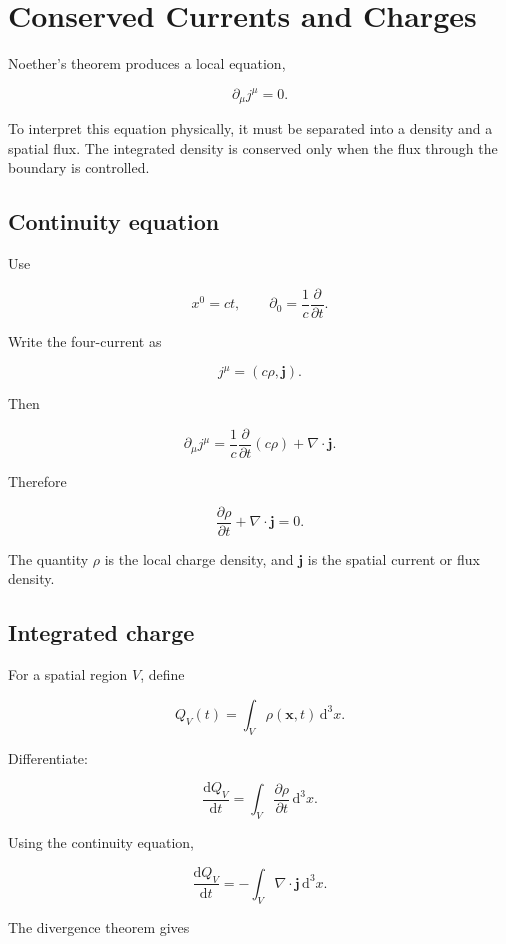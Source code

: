 \section{Conserved Currents and Charges}
\label{sec:conserved_currents_charges}

Noether's theorem produces a local equation,

\[
\partial_{\mu}j^{\mu}=0.
\]

To interpret this equation physically, it must be separated into a density and a spatial flux. The integrated density is conserved only when the flux through the boundary is controlled.

\subsection{Continuity equation}

Use

\[
x^{0}=ct,
\qquad
\partial_{0}
=
\frac{1}{c}
\frac{\partial}{\partial t}.
\]

Write the four-current as

\[
\boxed{
j^{\mu}
=
\left(
c\rho,
\mathbf{j}
\right)
}.
\]

Then

\[
\partial_{\mu}j^{\mu}
=
\frac{1}{c}
\frac{\partial}{\partial t}
\left(
c\rho
\right)
+
\nabla\cdot\mathbf{j}.
\]

Therefore

\[
\boxed{
\frac{\partial\rho}{\partial t}
+
\nabla\cdot\mathbf{j}
=
0
}.
\]

The quantity \(\rho\) is the local charge density, and \(\mathbf{j}\) is the spatial current or flux density.

\subsection{Integrated charge}

For a spatial region \(V\), define

\[
\boxed{
Q_V(t)
=
\int_V
\rho(\mathbf{x},t)
\,\mathrm{d}^{3}x
}.
\]

Differentiate:

\[
\frac{\mathrm{d}Q_V}{\mathrm{d}t}
=
\int_V
\frac{\partial\rho}{\partial t}
\,\mathrm{d}^{3}x.
\]

Using the continuity equation,

\[
\frac{\mathrm{d}Q_V}{\mathrm{d}t}
=
-
\int_V
\nabla\cdot\mathbf{j}
\,\mathrm{d}^{3}x.
\]

The divergence theorem gives

